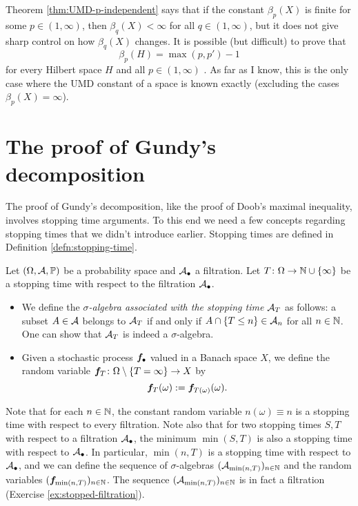 \begin{rmk}
  Theorem \ref{thm:UMD-p-independent} says that if the constant $\beta_{p}(X)$ is finite for some $p \in (1,\infty)$, then $\beta_{q}(X) < \infty$ for all $q \in (1,\infty)$, but it does not give sharp control on how $\beta_{q}(X)$ changes.
  It is possible (but difficult) to prove that
  \begin{equation*}
    \beta_{p}(H) = \max(p,p') - 1
  \end{equation*}
  for every Hilbert space $H$ and all $p \in (1,\infty)$ \cite[Corollary 4.5.15]{HNVW16}.
  As far as I know, this is the only case where the UMD constant of a space is known exactly (excluding the cases $\beta_{p}(X) = \infty$).
\end{rmk}


\section{The proof of Gundy's decomposition}

The proof of Gundy's decomposition, like the proof of Doob's maximal inequality, involves stopping time arguments.
To this end we need a few concepts regarding stopping times that we didn't introduce earlier.
Stopping times are defined in Definition \ref{defn:stopping-time}.

\begin{defn}
  Let $(\Omega,\mathcal{A},\mathbb{P})$ be a probability space and $\mathcal{A}_{\bullet}$ a filtration.
  Let $T \colon \Omega \rightarrow \mathbb{N} \cup \{\infty\}$ be a stopping time with respect to the filtration $\mathcal{A}_{\bullet}$.

  \begin{itemize}
  \item We define the \emph{$\sigma$-algebra associated with the stopping time} $\mathcal{A}_{T}$ as follows: a subset $A \in \mathcal{A}$ belongs to $\mathcal{A}_{T}$ if and only if $A \cap \{T \leq n\} \in \mathcal{A}_{n}$ for all $n \in \mathbb{N}$.
    One can show that $\mathcal{A}_{T}$ is indeed a $\sigma$-algebra.
  \item Given a stochastic process $\bm{f}_{\bullet}$ valued in a Banach space $X$, we define the random variable $\bm{f}_{T} \colon \Omega \setminus \{T = \infty\} \to X$ by
    \begin{equation*}
      \bm{f}_{T}(\omega) := \bm{f}_{T(\omega)}(\omega).
    \end{equation*}
  \end{itemize}
\end{defn}

Note that for each $n \in \mathbb{N}$, the constant random variable $n(\omega) \equiv n$ is a stopping time with respect to every filtration.
Note also that for two stopping times $S,T$ with respect to a filtration $\mathcal{A}_{\bullet}$, the minimum $\min(S,T)$ is also a stopping time with respect to $\mathcal{A}_{\bullet}$.
In particular, $\min(n,T)$ is a stopping time with respect to $\mathcal{A}_{\bullet}$, and we can define the sequence of $\sigma$-algebras $(\mathcal{A}_{\min(n,T)})_{n \in \mathbb{N}}$ and the random variables $(\bm{f}_{\min(n,T)})_{n \in \mathbb{N}}$.
The sequence $(\mathcal{A}_{\min(n,T)})_{n \in \mathbb{N}}$ is in fact a filtration (Exercise \ref{ex:stopped-filtration}).

